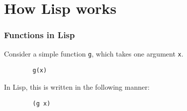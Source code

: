 \documentclass{beamer}
\begin{document}
\section{How Lisp works}


\begin{frame}[fragile] %
	\frametitle{Functions in Lisp}
	
	
	Consider a simple function \texttt{g}, which takes one argument \texttt{x}.
	
	
	\begin{example}
		\begin{verbatim}
		g(x)
		\end{verbatim}
	\end{example}
	
	
	In Lisp, this is written in the following manner:
	
	\begin{example}
		\begin{verbatim}
		(g x)
		\end{verbatim}
	\end{example}
	
\end{frame}
\end{document}
